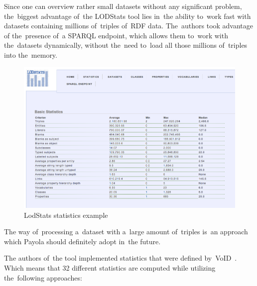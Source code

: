 Since one can overview rather small datasets without any significant problem, 
the~biggest advantage of~the LODStats tool lies in~the ability to~work fast with 
datasets containing millions of~triples of~RDF data. The~authors took advantage 
of the~presence of~a SPARQL endpoint, which allows them to~work with the~datasets 
dynamically, without the~need to~load all those millions of~triples into the~memory.


\begin{figure}
	\centering
	\includegraphics[width=140mm]{img/lodstats.png}
	\caption{LodStats statistics example}
	\label{fig:lodstats}
\end{figure}

The way of~processing a~dataset with a~large amount of~triples is~an approach 
which Payola should definitely adopt in~the future.

The authors of~the tool implemented statistics that were defined by~VoID~\cite{void}. Which 
means that 32 different statistics are computed while utilizing the~following 
approaches:

